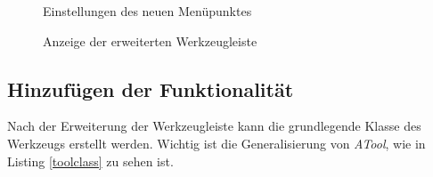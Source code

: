 \begin{figure}[H]
  \vspace{0.5cm}
  \centering
   \caption{Einstellungen des neuen Menüpunktes}
  \label{tool_handleditem}
  \vspace{0.5cm}
\end{figure}


\begin{figure}[H]
  \vspace{0.5cm}
  \centering
   \caption{Anzeige der erweiterten Werkzeugleiste}
  \label{tool_menunew}
  \vspace{0.5cm}
\end{figure}

\subsection{Hinzufügen der Funktionalität}

Nach der Erweiterung der Werkzeugleiste kann die grundlegende Klasse des Werkzeugs erstellt werden. Wichtig ist die Generalisierung von \textit{ATool}, wie in Listing \ref{toolclass} zu sehen ist.

